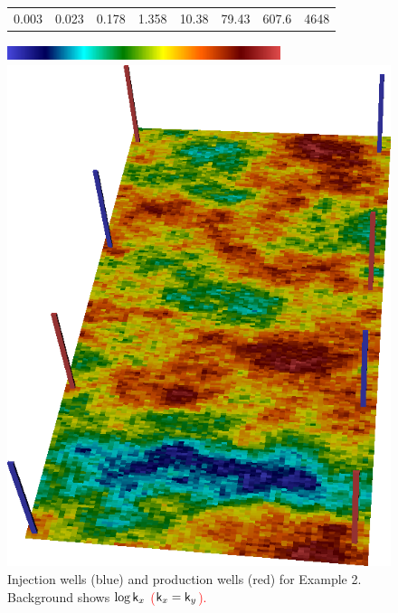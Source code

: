 \documentclass[twocolumn,numbook]{svjour3}          %
\newcommand{\red}[1]{\textcolor{red}{#1}}
\begin{document}
%
\begin{figure}[ht]
\begin{center}
     \begin{tabular}{cccccccc}
      0.003 &  0.023 & 0.178 & 1.358 & 10.38 & 79.43 & 607.6 &4648
      \end{tabular}
      \includegraphics[width=8cm, height=0.5cm]{VanEssenModelPermeabilityMapColorBar.png}
       
       \medskip

       \includegraphics[totalheight=3.2in]{SPE10TopModelPermeabilityMapConstantRotated.png} %


\end{center}
     \caption{Injection wells (blue) and production wells (red) for Example 2. Background shows \red{$\log \mathsf{k}_x$ ($ \mathsf{k}_x = \mathsf{k}_y$).}}
  \label{fig:PermeabilityMapAndWellsSpe10Top}
\end{figure}
%
\end{document}
